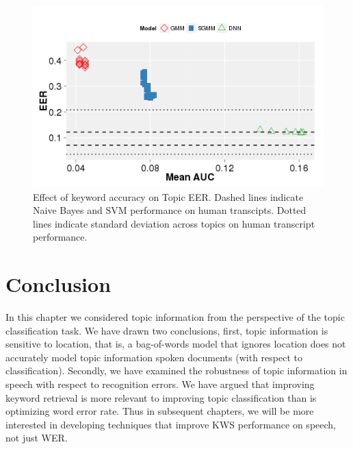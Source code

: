 \begin{figure}[t]
\centering
\includegraphics[width=0.75\linewidth]{graphs/ch3/nb-mauc-eer.png}
\caption[Effect of keyword accuracy on Topic EER]{\label{auc1} Effect of keyword accuracy on Topic EER.  Dashed lines indicate Naive Bayes and SVM performance on human transcipts.   Dotted lines indicate standard deviation across topics on human transcript performance.}
\end{figure}


\section{Conclusion}

In this chapter we considered topic information from the perspective of the topic classification task.   We have drawn two conclusions, first, topic information is sensitive to location, that is, a bag-of-words model that ignores location does not accurately model topic information spoken documents (with respect to classification).  Secondly, we have examined the robustness of topic information in speech with respect to recognition errors.  We have argued that improving keyword retrieval is more relevant to improving topic classification than is optimizing word error rate.  Thus in subsequent chapters, we will be more interested in developing techniques that improve KWS performance on speech, not just WER.

